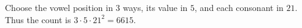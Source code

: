 Choose the vowel position in $3$ ways, its value in $5$, and each consonant in $21$. Thus the count is $\boxed{3\cdot5\cdot21^2=6615}$.
